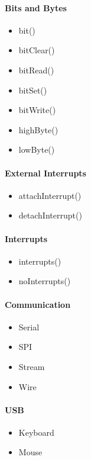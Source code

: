 \documentclass[../informe_krapp.tex]{subfiles}
\begin{document}
\begin{multicols}{2}
	\paragraph{Bits and Bytes}
	\begin{itemize}
		\item bit()
		\item bitClear()
		\item bitRead()
		\item bitSet()
		\item bitWrite()
		\item highByte()
		\item lowByte()
	\end{itemize}

	\paragraph{External Interrupts}
	\begin{itemize}
		\item attachInterrupt()
		\item detachInterrupt()
	\end{itemize}

	\paragraph{Interrupts}
	\begin{itemize}
		\item interrupts()
		\item noInterrupts()
	\end{itemize}

	\paragraph{Communication}
	\begin{itemize}
		\item Serial
		\item SPI
		\item Stream
		\item Wire
	\end{itemize}

	\paragraph{USB}
	\begin{itemize}
		\item Keyboard
		\item Mouse
	\end{itemize}
\end{multicols}
\end{document}

